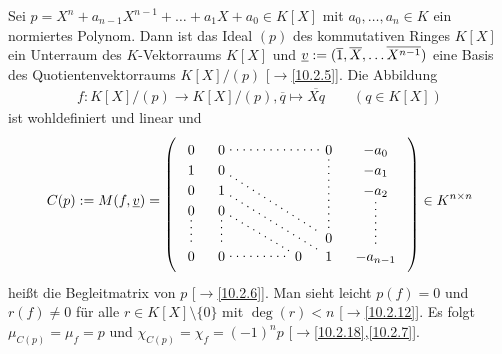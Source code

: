 \documentclass[../../main.tex]{subfiles}
\begin{document}
\begin{er}\label{17.5.1}
Sei $p=X^n+a_{n-1}X^{n-1}+\ldots +a_1X+a_0\in K[X]$ mit $a_0,\ldots ,a_n\in K$ ein normiertes Polynom. Dann ist das Ideal $(p)$ des kommutativen Ringes $K[X]$ ein Unterraum des $K$-Vektorraums $K[X]$ und ${\underline v}:=(\overline{1},\overline{X},\ldots \overline{X^{n-1}})$ eine Basis des Quotientenvektorraums $K[X]/(p)$ [$\to$\ref{10.2.5}]. Die Abbildung
\begin{align*}
f: K[X]/(p)\to K[X]/(p), \overline{q}\mapsto \overline{Xq}\qquad(q\in K[X])
\end{align*}
ist wohldefiniert und linear und
\begin{equation*}
C(p):=M(f,\v)=
\begin{tikzpicture}[loosely dotted,thick,baseline]
\matrix (m) [matrix of math nodes,nodes in empty cells,right delimiter=),left delimiter=(,column sep=1em]{
0&0&&&&0&-a_0\\
1&0&&&&  &-a_1\\
0&1&&&&  &-a_2\\
0&0\\
\\
 &   &&&&0\\
0&0&&&0&1&-a_{n-1}\\
} ;
\draw (m-1-2)-- (m-1-6);
\draw (m-2-2)-- (m-6-6);
\draw (m-3-2)-- (m-7-6);
\draw (m-4-2)-- (m-7-5);
\draw (m-1-6)-- (m-6-6);
\draw (m-3-7)-- (m-7-7);
\draw (m-4-1)-- (m-7-1);
\draw (m-4-2)-- (m-7-2) -- (m-7-5);
\end{tikzpicture}\in K^{n\times n}
\end{equation*}
heißt die Begleitmatrix von $p$ [$\to$\ref{10.2.6}]. Man sieht leicht $p(f)=0$ und $r(f)\neq 0$ für alle $r\in K[X]\setminus\{0\}$ mit $\deg(r)<n$ [$\to$\ref{10.2.12}]. Es folgt $\mu_{C(p)}=\mu_f=p$ und $\chi_{C(p)}=\chi_f=(-1)^np$ [$\to$\ref{10.2.18},\ref{10.2.7}].
\end{er}
\end{document}
